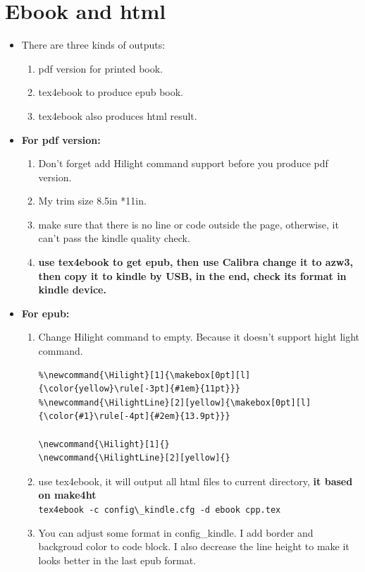 \documentclass[a4paper,12pt,twoside]{book}
\begin{document}
\section{Ebook and html}
\begin{itemize}

\item There are three kinds of outputs:
\begin{enumerate}
	\item pdf version for printed book.  
	\item tex4ebook to produce epub book.
	\item tex4ebook also produces html result.
\end{enumerate}

\item \textbf{For pdf version:}
\begin{enumerate}
	\item Don't forget add Hilight command support before you produce pdf version. 
	
	\item My trim size 8.5in *11in.
	
	\item make sure that there is no line or code outside the page, otherwise, it can't pass the kindle quality check.
	
	\item \textbf{use tex4ebook to get epub, then use Calibra change it to azw3, then copy it to kindle by USB, in the end, check its format in kindle device.}
\end{enumerate}

\item \textbf{For epub:}
\begin{enumerate}
	\item Change Hilight command to empty. Because it doesn't support hight light command.
\begin{verbatim}
%\newcommand{\Hilight}[1]{\makebox[0pt][l]{\color{yellow}\rule[-3pt]{#1em}{11pt}}}
%\newcommand{\HilightLine}[2][yellow]{\makebox[0pt][l]{\color{#1}\rule[-4pt]{#2em}{13.9pt}}}

\newcommand{\Hilight}[1]{}
\newcommand{\HilightLine}[2][yellow]{}
\end{verbatim}
\item use tex4ebook, it will output all html files to current directory, \textbf{it based on make4ht} \\
\verb|tex4ebook -c config\_kindle.cfg -d ebook cpp.tex|

\item You can adjust some format in config\_kindle. I add border and backgroud color to code block. I also decrease the line height to make it looks better in the last epub format.
\end{enumerate}


\end{itemize}
\end{document}
